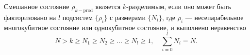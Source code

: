 Смешанное состояние $\rho_{k-\mathrm{prod}}$
является $k$-разделимым,
если оно может быть факторизовано на $l$ подсистем $\{\rho_i\}$ с размерами $\{N_i\}$,
где $\rho_i$ --- несепарабельное многокубитное состояние или однокубитное состояние,
и выполнено неравенство
\begin{equation}
  N > k \geq N_1 \geq N_2 \geq \dots \geq N_l \geq 1,
  \quad
  \sum_{i=0}^{l} N_i = N.
\end{equation}